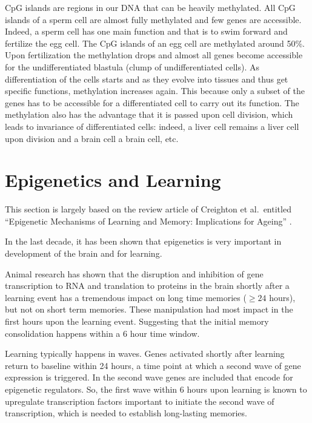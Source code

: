 \documentclass[
  11pt,
]{book}
\begin{document}
CpG islands are regions in our DNA that can be heavily methylated. All CpG islands of a sperm cell are almost fully methylated and few genes are accessible. Indeed, a sperm cell has one main function and that is to swim forward and fertilize the egg cell. The CpG islands of an egg cell are methylated around 50\%. Upon fertilization the methylation drops and almost all genes become accessible for the undifferentiated blastula (clump of undifferentiated cells). As differentiation of the cells starts and as they evolve into tissues and thus get specific functions, methylation increases again. This because only a subset of the genes has to be accessible for a differentiated cell to carry out its function. The methylation also has the advantage that it is passed upon cell division, which leads to invariance of differentiated cells: indeed, a liver cell remains a liver cell upon division and a brain cell a brain cell, etc.

\hypertarget{epigenetics-and-learning}{%
\section{Epigenetics and Learning}\label{epigenetics-and-learning}}

This section is largely based on the review article of Creighton et al.~entitled ``Epigenetic Mechanisms of Learning and Memory: Implications for Ageing'' \citep{Creighton2020}.

In the last decade, it has been shown that epigenetics is very important in development of the brain and for learning.

Animal research has shown that the disruption and inhibition of gene transcription to RNA and translation to proteins in the brain shortly after a learning event has a tremendous impact on long time memories (\(\geq 24\) hours), but not on short term memories. These manipulation had most impact in the first hours upon the learning event. Suggesting that the initial memory consolidation happens within a 6 hour time window.

Learning typically happens in waves. Genes activated shortly after learning return to baseline within 24 hours, a time point at which a second wave of gene expression is triggered.
In the second wave genes are included that encode for epigenetic regulators.
So, the first wave within 6 hours upon learning is known to upregulate transcription factors important to initiate the second wave of transcription, which is needed to establish long-lasting memories.
\end{document}
